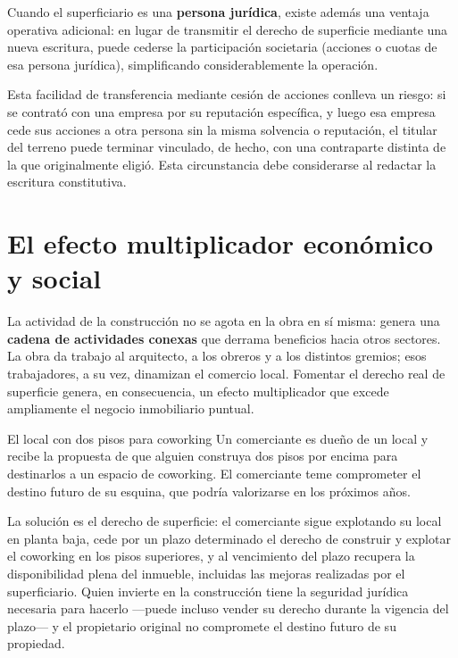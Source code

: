 \documentclass[12pt,oneside]{book}
\begin{document}
Cuando el superficiario es una \textbf{persona jurídica}, existe además una ventaja operativa adicional: en lugar de transmitir el derecho de superficie mediante una nueva escritura, puede cederse la participación societaria (acciones o cuotas de esa persona jurídica), simplificando considerablemente la operación.

\begin{important}
Esta facilidad de transferencia mediante cesión de acciones conlleva un riesgo: si se contrató con una empresa por su reputación específica, y luego esa empresa cede sus acciones a otra persona sin la misma solvencia o reputación, el titular del terreno puede terminar vinculado, de hecho, con una contraparte distinta de la que originalmente eligió. Esta circunstancia debe considerarse al redactar la escritura constitutiva.
\end{important}

\section{El efecto multiplicador económico y social}

La actividad de la construcción no se agota en la obra en sí misma: genera una \textbf{cadena de actividades conexas} que derrama beneficios hacia otros sectores. La obra da trabajo al arquitecto, a los obreros y a los distintos gremios; esos trabajadores, a su vez, dinamizan el comercio local. Fomentar el derecho real de superficie genera, en consecuencia, un efecto multiplicador que excede ampliamente el negocio inmobiliario puntual.

\begin{example}{El local con dos pisos para coworking}
Un comerciante es dueño de un local y recibe la propuesta de que alguien construya dos pisos por encima para destinarlos a un espacio de coworking. El comerciante teme comprometer el destino futuro de su esquina, que podría valorizarse en los próximos años.

La solución es el derecho de superficie: el comerciante sigue explotando su local en planta baja, cede por un plazo determinado el derecho de construir y explotar el coworking en los pisos superiores, y al vencimiento del plazo recupera la disponibilidad plena del inmueble, incluidas las mejoras realizadas por el superficiario. Quien invierte en la construcción tiene la seguridad jurídica necesaria para hacerlo ---puede incluso vender su derecho durante la vigencia del plazo--- y el propietario original no compromete el destino futuro de su propiedad.
\end{example}
\end{document}
